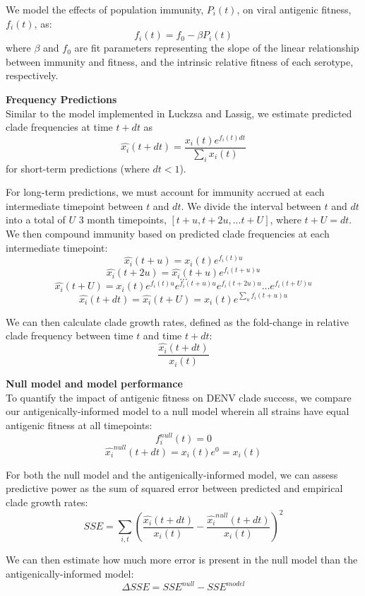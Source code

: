 \documentclass[11pt,oneside,letterpaper]{article}
\begin{document}
We model the effects of population immunity, $P_i(t)$, on viral antigenic fitness, $f_i(t)$, as:
$$f_i(t) = f_0-\beta P_i(t)$$
where $\beta$ and $f_0$ are fit parameters representing the slope of the linear relationship between immunity and fitness, and the intrinsic relative fitness of each serotype, respectively.

\textbf{Frequency Predictions}\\
Similar to the model implemented in Luckzsa and Lassig, we estimate predicted clade frequencies at time $t + dt$ as
$$\hat{x_i}(t+dt) = \frac{x_i(t) e^{f_i(t) dt}}{\sum_{i}x_i(t)}$$
for short-term predictions (where $dt < 1$).

For long-term predictions, we must account for immunity accrued at each intermediate timepoint between $t$ and $dt$.
We divide the interval between $t$ and $dt$ into a total of $U$ 3 month timepoints, $[t+u, t+2u, ... t+U]$, where $t+U=dt$.
We then compound immunity based on predicted clade frequencies at each intermediate timepoint:
$$\hat{x_i}(t+u) = x_i(t)e^{f_i(t) u}$$
$$\hat{x_i}(t+2u) = \hat{x_i}(t+u) e^{f_i(t+u)u}$$
$$...$$
$$\hat{x_i}(t+U) = x_i(t) e^{f_i(t)u} e^{f_i(t+u)u} e^{f_i(t+2u)u} ... e^{f_i(t+U)u}$$
$$\hat{x_i}(t+dt) = \hat{x_i}(t+U) = x_i(t) e^{\sum_{u}f_i(t+u)u}$$

We can then calculate clade growth rates, defined as the fold-change in relative clade frequency between time $t$ and time $t+dt$:
$$\frac{\hat{x_i}(t+dt)}{x_i(t)}$$

\textbf{Null model and model performance}\\
To quantify the impact of antigenic fitness on DENV clade success, we compare our antigenically-informed model to a null model wherein all strains have equal antigenic fitness at all timepoints:
$$f_i^{null}(t) = 0$$
$$\hat{x_i}^{null}(t+dt) = x_i(t) e^0 = x_i(t)$$

For both the null model and the antigenically-informed model, we can assess predictive power as the sum of squared error between predicted and empirical clade growth rates:
$$SSE = \sum_{i,t} (\frac{\hat{x_i}(t+dt)}{x_i(t)} - \frac{\hat{x_i}^{null}(t+dt)}{x_i(t)})^2$$

We can then estimate how much more error is present in the null model than the antigenically-informed model:
$$\Delta SSE = SSE^{null} - SSE^{model}$$
\end{document}
